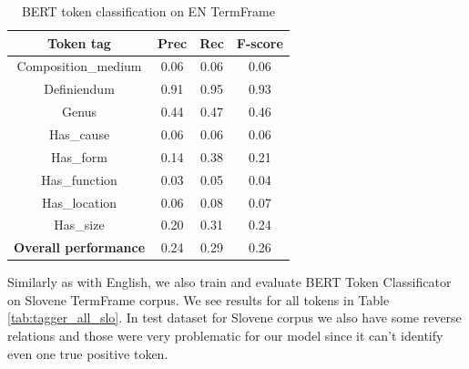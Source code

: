 \documentclass[fleqn,moreauthors,10pt]{ds_report}
\begin{document}
\begin{table}[!ht]
    \centering
    \begin{tabular}{|c|c|c|c|}
        \hline
        \textbf{Token tag} & \textbf{Prec} & \textbf{Rec} & \textbf{F-score} \\ \hline \hline
        Composition\_medium  &  0.06  &  0.06  &  0.06 \\ \hline
        Definiendum               &  0.91  &  0.95  &  0.93 \\ \hline
        Genus               &  0.44  &  0.47  &  0.46 \\ \hline
        Has\_cause           &  0.06  &  0.06  &  0.06 \\ \hline
        Has\_form           &  0.14  &  0.38  &  0.21 \\ \hline
        Has\_function        & 0.03  &   0.05  &  0.04 \\ \hline
        Has\_location        &  0.06  &  0.08  &  0.07 \\ \hline
        Has\_size            & 0.20 &  0.31  &  0.24 \\ \hline \hline
        \textbf{Overall performance} & 0.24 & 0.29 & 0.26 \\ \hline
    \end{tabular}
    \caption{BERT token classification on EN TermFrame}
    \label{tab:tagger_all}
\end{table}


\par Similarly as with English, we also train and evaluate BERT Token Classificator on Slovene TermFrame corpus. We see results for all tokens in Table \ref{tab:tagger_all_slo}. In test dataset for Slovene corpus we also have some reverse relations and those were very problematic for our model since it can't identify even one true positive token.
\end{document}

